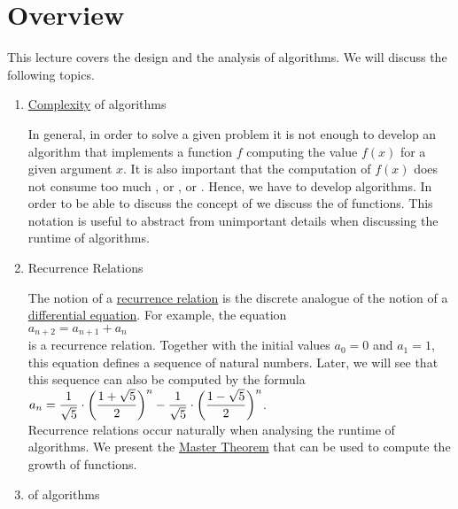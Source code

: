 \section{Overview}
This lecture covers the design and the analysis of algorithms.  We will discuss the following topics.
\begin{enumerate}
\item \href{http://en.wikipedia.org/wiki/Computational_complexity_theory}{Complexity}  of algorithms

      In general, in order to solve a given problem it is not enough to develop an algorithm that
      implements a function $f$ computing the  value $f(x)$ for a given argument $x$.  It is also important  
      that the computation of $f(x)$ does not consume too much , or , or .
      Hence, we have to develop  algorithms.  In order to be able to discuss the concept of
       we discuss the  of functions.  This notation is useful to abstract from
      unimportant details when discussing the runtime of algorithms.  
\item Recurrence Relations

       The notion of a \href{http://en.wikipedia.org/wiki/Recurrence_relation}{recurrence relation}
       is the discrete analogue of the notion of a 
       \href{http://en.wikipedia.org/wiki/Differential_equation}{differential equation}.
       For example, the equation
       \\[0.2cm]
       \hspace*{1.3cm}
       $a_{n+2} = a_{n+1} + a_n$
       \\[0.2cm]
       is a recurrence relation.  Together with the initial values $a_0 = 0$ and $a_1 = 1$, this equation
       defines a sequence of natural numbers.  Later, we will see that this sequence can also be computed by
       the formula
       \\[0.2cm]
       \hspace*{1.3cm}
       $\displaystyle a_{n} = \frac{1}{\sqrt{5}} \cdot \biggl(\frac{1+\sqrt{5}}{2}\biggr)^n - \frac{1}{\sqrt{5}} \cdot \biggl(\frac{1-\sqrt{5}}{2}\biggr)^n$.
       \\[0.2cm]
       Recurrence relations occur naturally when analysing the runtime of algorithms.  We present the 
       \href{https://en.wikipedia.org/wiki/Master_theorem_(analysis_of_algorithms)}{Master Theorem} that can
       be used to compute the growth of  functions.
\item {} of algorithms
      

\end{enumerate}
